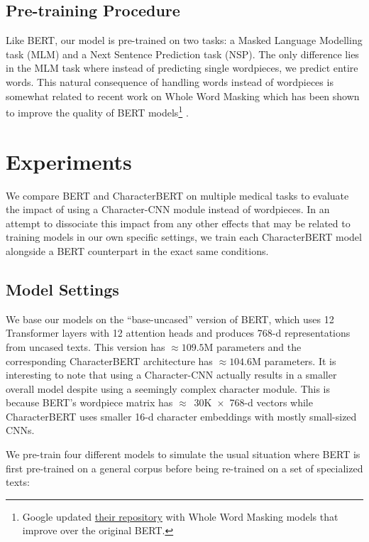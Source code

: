 \documentclass[11pt]{article}
\begin{document}
\subsection{Pre-training Procedure}

Like BERT, our model is pre-trained on two tasks: a Masked Language Modelling task (MLM) and a Next Sentence Prediction task (NSP). The only difference lies in the MLM task where instead of predicting single wordpieces, we predict entire words. This natural consequence of handling words instead of wordpieces is somewhat related to recent work on Whole Word Masking which has been shown to improve the quality of BERT models\footnote{Google updated \href{https://github.com/google-research/bert}{their repository} with Whole Word Masking models that improve over the original BERT.} \cite{cui2019pre}.

\section{Experiments}

We compare BERT and CharacterBERT on multiple medical tasks to evaluate the impact of using a Character-CNN module instead of wordpieces. In an attempt to dissociate this impact from any other effects that may be related to training models in our own specific settings, we train each CharacterBERT model alongside a BERT counterpart in the exact same conditions.

\subsection{Model Settings}\label{modelSettings}

We base our models on the ``base-uncased'' version of BERT, which uses 12 Transformer layers with 12 attention heads and produces 768-d representations from uncased texts. This version has $\approx 109.5$M parameters and the corresponding CharacterBERT architecture has $\approx 104.6$M parameters. It is interesting to note that using a Character-CNN actually results in a smaller overall model despite using a seemingly complex character module. This is because BERT's wordpiece matrix has $\approx$~30K~$\times$~\mbox{768-d} vectors while CharacterBERT uses smaller 16-d character embeddings with mostly small-sized CNNs.

We pre-train four different models to simulate the usual situation where BERT is first pre-trained on a general corpus before being re-trained on a set of specialized texts:
\end{document}
